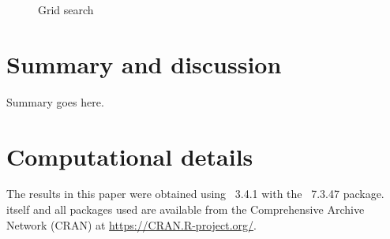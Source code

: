 \documentclass[article]{jss}
\begin{document}
\begin{figure}[H]
{  } 
  \caption{Grid search}
  \label{fig:LikeGrid}
\end{figure}






\section{Summary and discussion} \label{sec:summary}

Summary goes here. 



\section*{Computational details}


The results in this paper were obtained using
~3.4.1 with the
~7.3.47 package.  itself
and all packages used are available from the Comprehensive
 Archive Network (CRAN) at
\url{https://CRAN.R-project.org/}.
\end{document}
